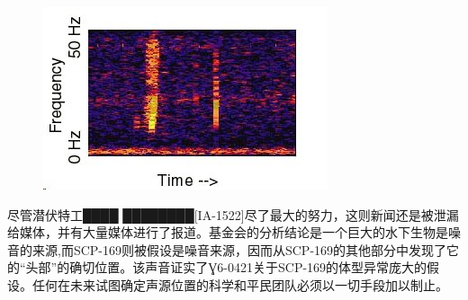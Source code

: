 \begin{figure}[H]
    \centering
    \includegraphics[width=0.5\linewidth]{images/SCP-169.jpg}
\end{figure}

尽管潜伏特工████ ████████{[}IA-1522]尽了最大的努力，这则新闻还是被泄漏给媒体，并有大量媒体进行了报道。基金会的分析结论是一个巨大的水下生物是噪音的来源,而SCP-169则被假设是噪音来源，因而从SCP-169的其他部分中发现了它的“头部”的确切位置。该声音证实了Ɣ6-0421关于SCP-169的体型异常庞大的假设。任何在未来试图确定声源位置的科学和平民团队必须以一切手段加以制止。
